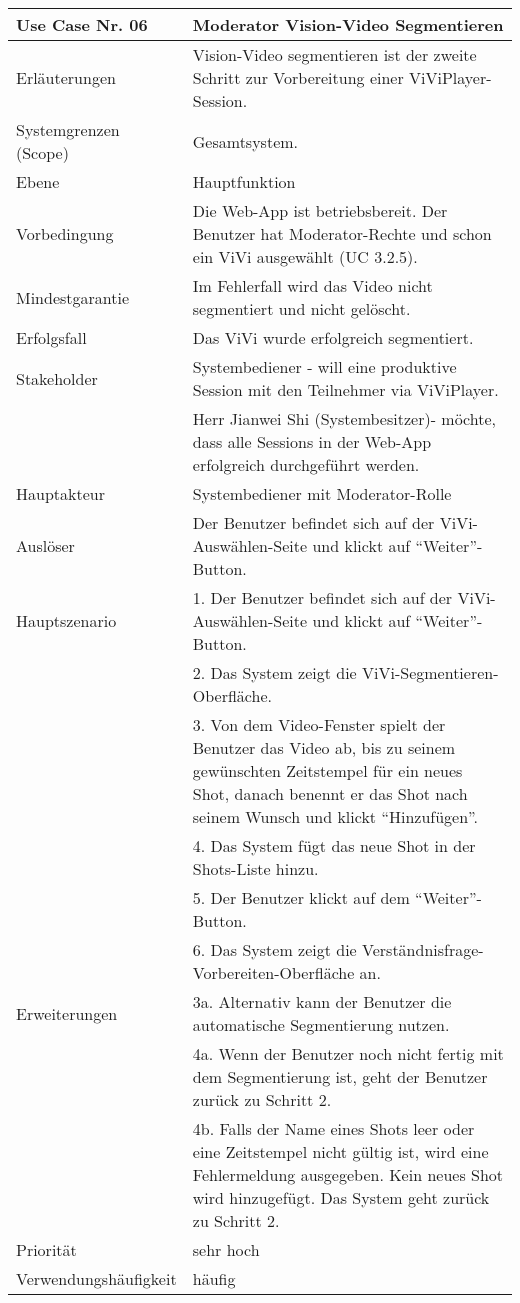 \begin{tabularx}{\linewidth}{|l|X|}
	\hline
	Use Case Nr. 06			& \textbf{Moderator Vision-Video Segmentieren} \\ \hline
	Erläuterungen			& Vision-Video segmentieren ist der zweite Schritt zur 
							  Vorbereitung einer ViViPlayer-Session. \\ \hline
	Systemgrenzen (Scope)	& Gesamtsystem. \\ \hline
	Ebene					& Hauptfunktion \\ \hline
	Vorbedingung			& Die Web-App ist betriebsbereit. Der Benutzer hat 
	                          Moderator-Rechte und schon ein ViVi ausgewählt (UC 3.2.5). \\ \hline
	Mindestgarantie			& Im Fehlerfall wird das Video nicht segmentiert und nicht 
	                          gelöscht. \\ \hline
	Erfolgsfall 			& Das ViVi wurde erfolgreich segmentiert. \\ \hline
	Stakeholder				& Systembediener - will eine produktive Session mit den 
	                          Teilnehmer via ViViPlayer. \\
							& Herr Jianwei Shi (Systembesitzer)- möchte, dass alle Sessions 
							  in der Web-App erfolgreich durchgeführt werden. \\ \hline
	Hauptakteur				& Systembediener mit Moderator-Rolle \\ \hline
	Auslöser				& Der Benutzer befindet sich auf der ViVi-Auswählen-Seite 
							  und klickt auf ``Weiter''-Button. \\ \hline	
	Hauptszenario			& 1. Der Benutzer befindet sich auf der ViVi-Auswählen-Seite
							  und klickt auf ``Weiter''-Button. \\
							& 2. Das System zeigt die ViVi-Segmentieren-Oberfläche. \\
							& 3. Von dem Video-Fenster spielt der Benutzer das Video ab, bis 
							  zu seinem gewünschten Zeitstempel für ein neues Shot, danach 
							  benennt er das Shot nach seinem Wunsch und klickt 
							  ``Hinzufügen''. \\
							& 4. Das System fügt das neue Shot in der Shots-Liste 
							  hinzu. \\
							& 5. Der Benutzer klickt auf dem ``Weiter''-Button. \\
							& 6. Das System zeigt die Verständnisfrage-Vorbereiten-Oberfläche 
							  an. \\ \hline
	Erweiterungen			& 3a. Alternativ kann der Benutzer die automatische 
							  Segmentierung nutzen. \\
							& 4a. Wenn der Benutzer noch nicht fertig mit dem Segmentierung 
							  ist, geht der Benutzer zurück zu Schritt 2. \\ 
							& 4b. Falls der Name eines Shots leer oder eine Zeitstempel 
							  nicht gültig ist, wird eine Fehlermeldung ausgegeben. Kein neues Shot wird hinzugefügt. Das System geht zurück zu Schritt 2. \\ \hline
	Priorität				& sehr hoch \\ \hline
	Verwendungshäufigkeit	& häufig \\ \hline
\end{tabularx}